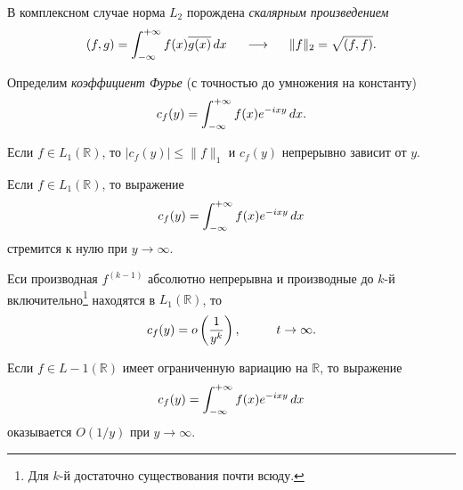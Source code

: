  \begin{to_def}
     В комплексном случае норма $L_2$ порождена \textit{скалярным произведением}
     \begin{equation*}
         (f, g) = \int_{-\infty}^{+\infty} f(x) \overline{g(x)} \, d x
         \hspace{0.5cm} \longrightarrow \hspace{0.5cm}
         \|f\|_2 = \sqrt{(f, f)}.
     \end{equation*}
 \end{to_def}


\begin{to_def}
    Определим \textit{коэффициент Фурье} (с точностью до умножения на константу)
    \begin{equation*}
        c_f (y) = \int_{-\infty}^{+\infty} f(x) e^{-ixy} \, d x.
    \end{equation*}
\end{to_def}

\begin{to_thr}[]
    Если $f \in L_1 (\mathbb{R})$, то $|c_f (y)| \leq \|f\|_1$ и $c_f (y)$ непрерывно зависит от $y$.
\end{to_thr}

\begin{to_thr}
    Если $f \in L_1 (\mathbb{R})$, то выражение
    \begin{equation*}
        c_f (y) = \int_{-\infty}^{+\infty} f(x) e^{-ixy} \, d x
    \end{equation*}
    стремится к нулю при $y \to \infty$.
\end{to_thr}

\begin{to_lem}
    Еси производная $f^{(k-1)}$ абсолютно непрерывна и производные до $k$-й включительно\footnote{
        Для $k$-й достаточно существования почти всюду.
    }  находятся в $L_1 (\mathbb{R})$, то
    \begin{equation*}
        c_f (y) = o \left(\frac{1}{y^k}\right),
        \hspace{1 cm}
        t \to \infty.
    \end{equation*}
\end{to_lem}

\begin{to_thr}[]
    Если $f \in L-1 (\mathbb{R})$ имеет ограниченную вариацию на $\mathbb{R}$, то выражение
    \begin{equation*}
        c_f (y) = \int_{-\infty}^{+\infty} f(x) e^{-ixy} \, d x
    \end{equation*}
    оказывается $O(1/y)$ при $y \to \infty$.
\end{to_thr}

